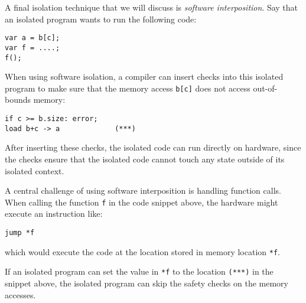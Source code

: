 A final isolation technique that we will discuss
is \emph{software interposition}.
Say that an isolated program wants to run the following code:
\begin{lstlisting}
var a = b[c];
var f = ....;
f();
\end{lstlisting}

When using software isolation, a compiler can insert checks
into this isolated program to make sure that the memory access
\texttt{b[c]} does not access out-of-bounds memory:
\begin{lstlisting}
if c >= b.size: error;
load b+c -> a             (***)
\end{lstlisting}
After inserting these checks,
the isolated code can run directly on hardware,
since the checks ensure that the isolated code cannot touch 
any state outside of its isolated context.

A central challenge of using software interposition is handling
function calls.
When calling the function \texttt{f} in the code snippet above,
the hardware might execute an instruction like:
\begin{lstlisting}
jump *f
\end{lstlisting}
which would execute the code at the location stored in 
memory location \texttt{*f}.

If an isolated program can set the value in \texttt{*f}
to the location \texttt{(***)} in the snippet above,
the isolated program can skip the safety checks on the 
memory accesses.


